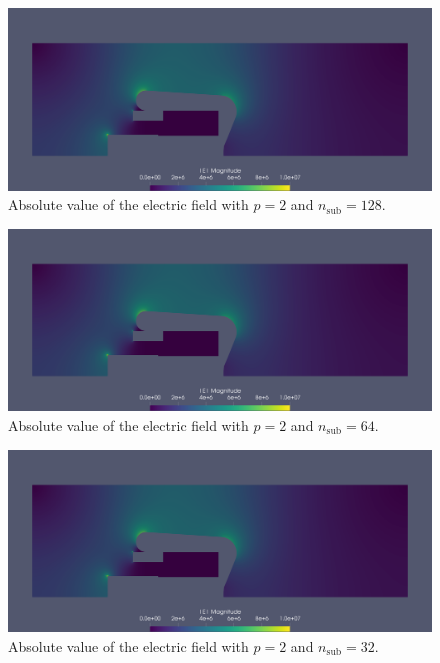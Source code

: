 \begin{center}
\begin{figure}[H]
  \includegraphics[width=\textwidth]{figures/200kV/degree=2_nsub=128}
  \caption{Absolute value of the electric field with $p=2$ and $n_\mathrm{sub}=128$.}
\end{figure}
\end{center}

\begin{center}
\begin{figure}[H]
  \includegraphics[width=\textwidth]{figures/200kV/degree=2_nsub=64}
  \caption{Absolute value of the electric field with $p=2$ and $n_\mathrm{sub}=64$.}
\end{figure}
\end{center}

\begin{center}
\begin{figure}[H]
  \includegraphics[width=\textwidth]{figures/200kV/degree=2_nsub=32}
  \caption{Absolute value of the electric field with $p=2$ and $n_\mathrm{sub}=32$.}
  \label{fig:electric_field_optim}
\end{figure}
\end{center}

